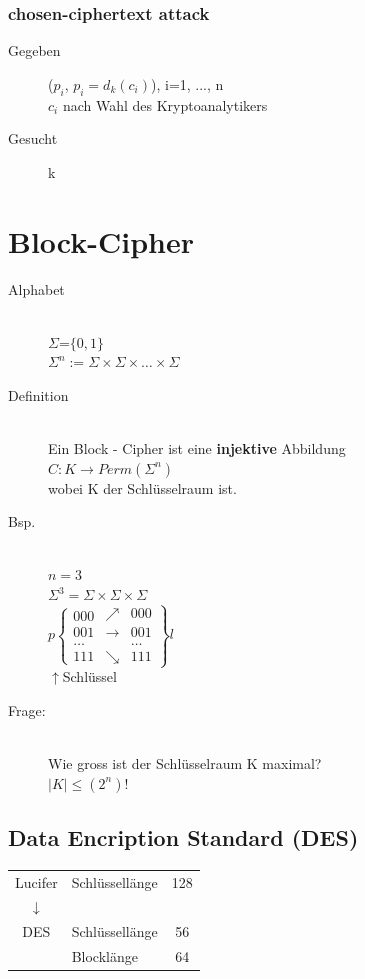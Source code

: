 \documentclass[landscape,twocolumn,a4paper]{article}
\newcommand{\ra}{\rightarrow}
\newcommand{\Brackal}[2]{\left\lbrace\begin{array}{#1} #2 \end{array}\right.} %
\newcommand{\Brackar}[2]{\left.\begin{array}{#1} #2 \end{array}\right\rbrace} %
\begin{document}
\subsubsection{chosen-ciphertext attack}
\begin{description}
	\item[Gegeben] ($p_i$, $p_i=d_k(c_i)$), i=1, ..., n \\
		$c_i$ nach Wahl des Kryptoanalytikers
	\item[Gesucht] k
\end{description}
\section{Block-Cipher}
\begin{description}
	\item[Alphabet] \hfill \\
		$\Sigma$=$\{0,1\}$ \\
		$\Sigma^n := \Sigma \times \Sigma \times \dots \times \Sigma$ 
	\item[Definition] \hfill \\
		Ein Block - Cipher ist eine \textbf{injektive} Abbildung \\
		$C: K \ra Perm(\Sigma^n)$ \\
		wobei K der Schlüsselraum ist.
	\item[Bsp.] \hfill \\
		$n=3$ \\
		$\Sigma^3=\Sigma\times\Sigma\times\Sigma$\\
$p\Brackal{c}{000\\001\\\dots\\111}\Brackar{cc}{\nearrow&000\\\to&001\\&\dots\\\searrow&111}l$\\
\hspace*{1.8cm}$\uparrow$Schlüssel\\
	\item[Frage:] \hfill \\
		Wie gross ist der Schlüsselraum K maximal? \\
		$|K| \leq (2^n)!$
\end{description}
\subsection{Data Encription Standard (DES)}
\begin{tabular}{clc}
 Lucifer&Schlüssellänge& 128\\
 $\downarrow$\\
 DES&Schlüssellänge& 56\\
 &Blocklänge& 64
\end{tabular}\\
\end{document}
